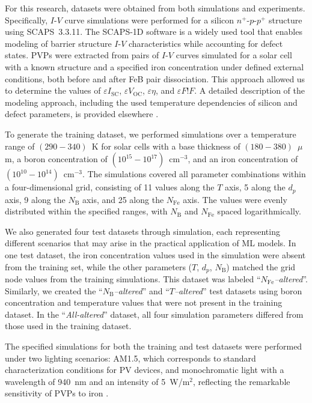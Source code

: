 \documentclass[a4paper,fleqn]{cas-sc}
\begin{document}
For this research, datasets were obtained from both simulations and experiments.
Specifically, $I$-$V$ curve simulations were performed for a silicon $n^+$-$p$-$p^+$ structure using SCAPS~3.3.11.
The SCAPS-1D software \cite{SCAPS1} is a widely used tool
\cite{MasumMia2025, Joshi2024, Ravidas2024, Liu2024, You2023, SCAPSDefect3}
that enables modeling of barrier structure $I$-$V$ characteristics while accounting for defect states.
PVPs were extracted from pairs of $I$-$V$ curves simulated for a solar cell with a known structure
and a specified iron concentration under defined external conditions, both before and after FeB pair dissociation.
This approach allowed us to determine the values of $\varepsilon I_\mathrm{SC}$, $\varepsilon V_\mathrm{OC}$, $\varepsilon \eta$, and $\varepsilon F!F$.
A detailed description of the modeling approach, including the used temperature dependencies of silicon and defect parameters,
is provided elsewhere \cite{Olikh2019SM, Olikh2025MSEB}.


To generate the training dataset, we performed simulations over a temperature range of $(290-340)$~K
for solar cells with a base thickness of $(180-380)$~$\mu$m,
a boron concentration of $(10^{15} - 10^{17})$~cm$^{-3}$, and an iron concentration of $(10^{10}-10^{14})$~cm$^{-3}$.
The simulations covered all parameter combinations within a four-dimensional grid, consisting of 11 values along the $T$ axis,
5 along the $d_p$ axis,
9 along the $N_\mathrm{B}$ axis, and 25 along the $N_\mathrm{Fe}$ axis.
The values were evenly distributed within the specified ranges, with $N_\mathrm{B}$ and $N_\mathrm{Fe}$ spaced logarithmically.

We also generated four test datasets through simulation,
each representing different scenarios that may arise in the practical application of ML models.
In one test dataset, the iron concentration values used in the simulation were absent from the training set,
while the other parameters ($T$, $d_p$, $N_\mathrm{B}$) matched the grid node values from the training simulations.
This dataset was labeled ``\textit{$N_\mathrm{Fe}$--altered}''.
Similarly, we created the ``\textit{$N_\mathrm{B}$--altered}'' and ``\textit{$T$--altered}'' test datasets using boron concentration and temperature values that were not present in the training dataset.
In the ``\textit{All-altered}'' dataset, all four simulation parameters differed from those used in the training dataset.


The specified simulations for both the training and test datasets were performed under two lighting scenarios:
AM1.5, which corresponds to standard characterization conditions for PV devices,
and monochromatic light with a wavelength of 940~nm and an intensity of 5~W/m$^{2}$,
reflecting the remarkable sensitivity of PVPs to iron \cite{Olikh2025MSEB}.
\end{document}
